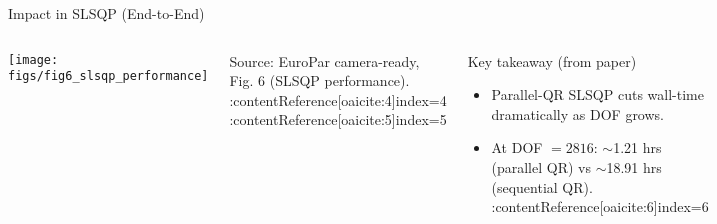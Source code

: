 \begin{frame}{Impact in SLSQP (End-to-End)}
\small
\begin{columns}[T,onlytextwidth]

  \centering
  \texttt{[image: figs/fig6\_slsqp\_performance]}

  \vspace{1mm}
  {\scriptsize Source: EuroPar camera-ready, Fig. 6 (SLSQP performance).  :contentReference[oaicite:4]{index=4}  :contentReference[oaicite:5]{index=5} }

  \begin{block}{Key takeaway (from paper)}
    \begin{itemize}\itemsep3pt
      \item Parallel-QR SLSQP cuts wall-time dramatically as DOF grows.
      \item At DOF \(=2816\): \(\sim\)1.21 hrs (parallel QR) vs \(\sim\)18.91 hrs (sequential QR).%
      {\scriptsize \;:contentReference[oaicite:6]{index=6}}
    \end{itemize}
  \end{block}
\end{columns}
\end{frame}
